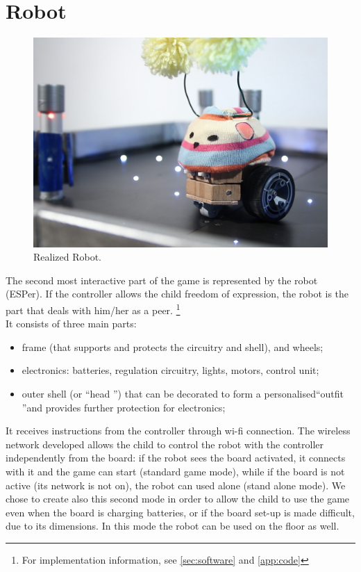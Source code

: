 \documentclass[a4paper,twoside]{book}
\begin{document}
\section{Robot}

\begin{figure}[h]
\centering
\includegraphics[width=0.8\linewidth]{img/IMG_20160827_163033_1} 
\caption{Realized Robot.}
\end{figure}

The second most interactive part of the game is represented by the robot (ESPer). If the controller allows the child freedom of expression, the robot is the part that deals with him/her as a peer. 
\footnote{For implementation information, see \autoref{sec:software} and \autoref{app:code} }
\\
It consists of three main parts:
\begin{itemize}
\item frame (that supports and protects the circuitry and shell), and wheels;
\item electronics: batteries, regulation circuitry, lights, motors, control unit;
\item outer shell (or \textquotedblleft head \textquotedblright) that can be decorated to form a personalised\textquotedblleft outfit \textquotedblright and provides further protection for electronics;
\end{itemize}
It receives instructions from the controller through wi-fi connection. The wireless network developed allows the child to control the robot with the controller independently from the board: if the robot sees the board activated, it connects with it and the game can start (standard game mode), while if the board is not active (its network is not on), the robot can used alone (stand alone mode). We chose to create also this second mode in order to allow the child to use the game even when the board is charging batteries, or if the board set-up is made difficult, due to its dimensions. In this mode the robot can be used on the floor as well.
\end{document}

